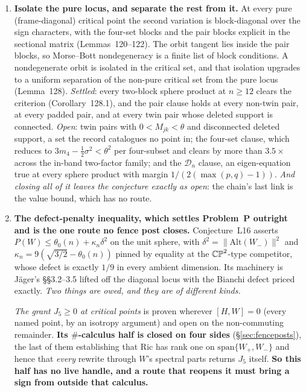 \begin{enumerate}[leftmargin=1.8em]
\item \textbf{Isolate the pure locus, and separate the rest from it.} At every pure (frame-diagonal) critical point the second variation is block-diagonal over the sign characters, with the four-set blocks and the pair blocks explicit in the sectional matrix (Lemmas~120--122). The orbit tangent lies inside the pair blocks, so Morse--Bott nondegeneracy is a finite list of block conditions. A nondegenerate orbit is isolated in the critical set, and that isolation upgrades to a uniform separation of the non-pure critical set from the pure locus (Lemma~128). \emph{Settled}: every two-block sphere product at $n\ge12$ clears the criterion (Corollary~128.1), and the pair clause holds at every non-twin pair, at every padded pair, and at every twin pair whose deleted support is connected. \emph{Open}: twin pairs with $0<M_{jk}<\theta$ and disconnected deleted support, a set the record catalogues no point in; the four-set clause, which reduces to $3m_4-\tfrac12\sigma^2<\theta^2$ per four-subset and clears by more than $3.5\times$ across the in-band two-factor family; and the $\mathcal D_n$ clause, an eigen-equation true at every sphere product with margin $1/(2(\max(p,q)-1))$. \emph{And closing all of it leaves the conjecture exactly as open}: the chain's last link is the value bound, which has no route.

\item \textbf{The defect-penalty inequality, which settles Problem~P outright and is the one route no fence post closes.} Conjecture~L16 asserts $P(W)\le\theta_0(n)+\kappa_n\delta^2$ on the unit sphere, with $\delta^2=\|\mathrm{Alt}(W_-)\|^2$ and $\kappa_n=9(\sqrt{3/2}-\theta_0(n))$ pinned by equality at the $\mathbb{CP}^2$-type competitor, whose defect is exactly $1/9$ in every ambient dimension. Its machinery is J\"ager's \S\S3.2--3.5 lifted off the diagonal locus with the Bianchi defect priced exactly. \emph{Two things are owed, and they are of different kinds.}

\emph{The grant $J_5\ge0$ at critical points} is proven wherever $[H,W]=0$ (every named point, by an isotropy argument) and open on the non-commuting remainder. \textbf{Its $\#$-calculus half is closed on four sides} (\S\ref{sec:fenceposts}), the last of them establishing that $\mathrm{Ric}$ has rank one on $\mathrm{span}\{W_+,W_-\}$ and hence that \emph{every} rewrite through $W$'s spectral parts returns $J_5$ itself. \textbf{So this half has no live handle, and a route that reopens it must bring a sign from outside that calculus.}


\end{enumerate}
